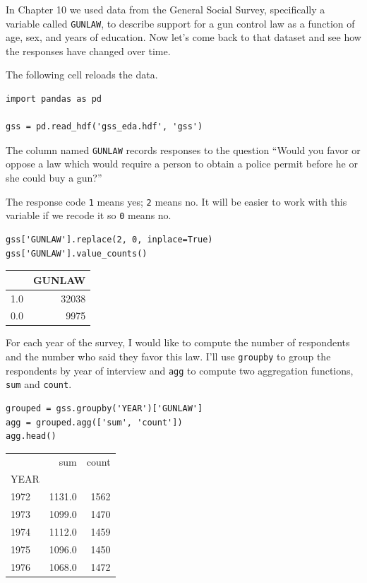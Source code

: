 In Chapter 10 we used data from the General Social Survey, specifically
a variable called \passthrough{\lstinline!GUNLAW!}, to describe support
for a gun control law as a function of age, sex, and years of education.
Now let's come back to that dataset and see how the responses have
changed over time.

The following cell reloads the data.

\begin{lstlisting}[]
import pandas as pd

gss = pd.read_hdf('gss_eda.hdf', 'gss')
\end{lstlisting}

The column named \passthrough{\lstinline!GUNLAW!} records responses to
the question ``Would you favor or oppose a law which would require a
person to obtain a police permit before he or she could buy a gun?''

The response code \passthrough{\lstinline!1!} means yes;
\passthrough{\lstinline!2!} means no. It will be easier to work with
this variable if we recode it so \passthrough{\lstinline!0!} means no.

\begin{lstlisting}[]
gss['GUNLAW'].replace(2, 0, inplace=True)
gss['GUNLAW'].value_counts()
\end{lstlisting}

\begin{tabular}{lr}
\midrule
{} &  GUNLAW \\
\midrule
1.0 &   32038 \\
0.0 &    9975 \\
\midrule
\end{tabular}

For each year of the survey, I would like to compute the number of
respondents and the number who said they favor this law. I'll use
\passthrough{\lstinline!groupby!} to group the respondents by year of
interview and \passthrough{\lstinline!agg!} to compute two aggregation
functions, \passthrough{\lstinline!sum!} and
\passthrough{\lstinline!count!}.

\begin{lstlisting}[]
grouped = gss.groupby('YEAR')['GUNLAW']
agg = grouped.agg(['sum', 'count'])
agg.head()
\end{lstlisting}

\begin{tabular}{lrr}
\midrule
{} &     sum &  count \\
YEAR &         &        \\
\midrule
1972 &  1131.0 &   1562 \\
1973 &  1099.0 &   1470 \\
1974 &  1112.0 &   1459 \\
1975 &  1096.0 &   1450 \\
1976 &  1068.0 &   1472 \\
\midrule
\end{tabular}

